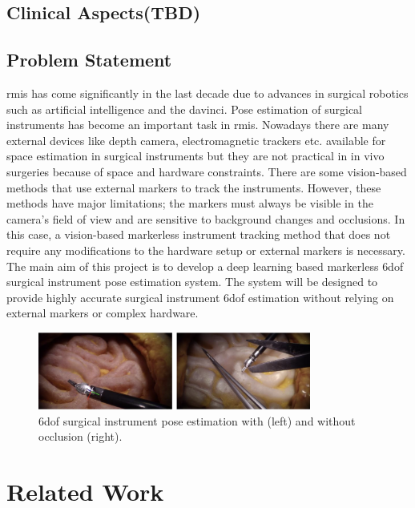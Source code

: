 \documentclass[12pt]{article}
\begin{document}
\subsection{Clinical Aspects(TBD)}

\subsection{Problem Statement}
\gls{rmis} has come significantly in the last decade due to advances in surgical robotics such as artificial intelligence and the \gls{davinci}. Pose estimation of surgical instruments has become an important task in \gls{rmis}. 
Nowadays there are many external devices like depth camera, electromagnetic trackers etc. available for space estimation in surgical instruments but they are not practical in in vivo surgeries because of space and hardware constraints\cite{enhancedmarker}. There are some vision-based methods that use external markers to track the instruments. However, these methods have major limitations; the markers must always be visible in the camera's field of view and are sensitive to background changes and occlusions\cite{10160287}. In this case, a vision-based markerless instrument tracking method that does not require any modifications to the hardware setup or external markers is necessary. The main aim of this project is to develop a deep learning based markerless \gls{6dof} surgical instrument pose estimation system. The system will be designed to provide highly accurate surgical instrument \gls{6dof} estimation without relying on external markers or complex hardware.

\begin{figure}[H]
            \centering
            \includegraphics[width=0.8\textwidth]{6Dof.png}
            \caption{\gls{6dof} surgical instrument pose estimation with (left) and without occlusion (right). \cite{surgripe2024}}
      \end{figure}


\section{Related Work}
\end{document}
